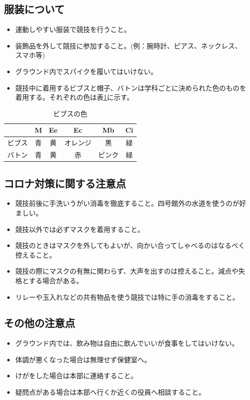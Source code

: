\documentclass[titlepage]{jarticle}
\begin{document}
  \subsection{服装について}
   \begin{itemize}
    \item 運動しやすい服装で競技を行うこと。
    \item 装飾品を外して競技に参加すること。(例：腕時計、ピアス、ネックレス、スマホ等)
    \item グラウンド内でスパイクを履いてはいけない。 
    \item 競技中に着用するビブスと帽子、バトンは学科ごとに決められた色のものを着用する。それぞれの色は表\ref{colour}に示す。
   \end{itemize}
   \begin{table}[H]
    \caption{ビブスの色}
    \centering
    \label{colour}
    \begin{tabular}{c||ccccc}
       &M &Ee &Ec &Mb &Ci \\ \hline\hline
     ビブス&青&黄&オレンジ&黒&緑\\
     バトン&青&黄&赤&ピンク&緑\\
    \end{tabular}
   \end{table}
  \subsection{コロナ対策に関する注意点}
   \begin{itemize}
    \item 競技前後に手洗いうがい消毒を徹底すること。四号館外の水道を使うのが好ましい。
    \item 競技以外では{\large 必ず}マスクを着用すること。
    \item 競技のときはマスクを外してもよいが、向かい合ってしゃべるのはなるべく控えること。
    \item 競技の際にマスクの有無に関わらず、大声を出すのは控えること。減点や失格とする場合がある。
    \item リレーや玉入れなどの共有物品を使う競技では特に手の消毒をすること。
   \end{itemize}
  \subsection{その他の注意点}
   \begin{itemize}
    \item グラウンド内では、飲み物は自由に飲んでいいが食事をしてはいけない。
    \item 体調が悪くなった場合は無理せず保健室へ。
    \item けがをした場合は本部に連絡すること。
    \item 疑問点がある場合は本部へ行くか近くの役員へ相談すること。
   \end{itemize}
\end{document}
